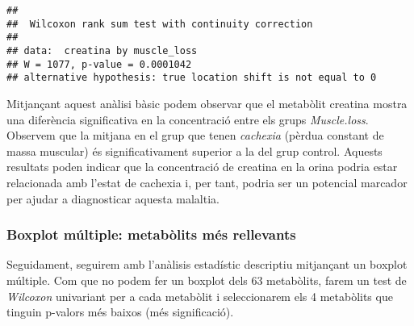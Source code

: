 \documentclass[
]{article}
\newenvironment{Shaded}{\begin{snugshade}}{\end{snugshade}}
\newcommand{\AttributeTok}[1]{\textcolor[rgb]{0.13,0.29,0.53}{#1}}
\newcommand{\CommentTok}[1]{\textcolor[rgb]{0.56,0.35,0.01}{\textit{#1}}}
\newcommand{\ConstantTok}[1]{\textcolor[rgb]{0.56,0.35,0.01}{#1}}
\newcommand{\ControlFlowTok}[1]{\textcolor[rgb]{0.13,0.29,0.53}{\textbf{#1}}}
\newcommand{\DecValTok}[1]{\textcolor[rgb]{0.00,0.00,0.81}{#1}}
\newcommand{\FunctionTok}[1]{\textcolor[rgb]{0.13,0.29,0.53}{\textbf{#1}}}
\newcommand{\NormalTok}[1]{#1}
\newcommand{\OtherTok}[1]{\textcolor[rgb]{0.56,0.35,0.01}{#1}}
\newcommand{\SpecialCharTok}[1]{\textcolor[rgb]{0.81,0.36,0.00}{\textbf{#1}}}
\begin{document}
\begin{verbatim}
## 
##  Wilcoxon rank sum test with continuity correction
## 
## data:  creatina by muscle_loss
## W = 1077, p-value = 0.0001042
## alternative hypothesis: true location shift is not equal to 0
\end{verbatim}

Mitjançant aquest anàlisi bàsic podem observar que el metabòlit creatina
mostra una diferència significativa en la concentració entre els grups
\emph{Muscle.loss}. Observem que la mitjana en el grup que tenen
\emph{cachexia} (pèrdua constant de massa muscular) és significativament
superior a la del grup control. Aquests resultats poden indicar que la
concentració de creatina en la orina podria estar relacionada amb
l'estat de cachexia i, per tant, podria ser un potencial marcador per
ajudar a diagnosticar aquesta malaltia.

\subsubsection{Boxplot múltiple: metabòlits més
rellevants}\label{boxplot-muxfaltiple-metabuxf2lits-muxe9s-rellevants}

Seguidament, seguirem amb l'anàlisis estadístic descriptiu mitjançant un
boxplot múltiple. Com que no podem fer un boxplot dels 63 metabòlits,
farem un test de \emph{Wilcoxon} univariant per a cada metabòlit i
seleccionarem els 4 metabòlits que tinguin p-valors més baixos (més
significació).

\begin{Shaded}
\end{Shaded}
\end{document}

